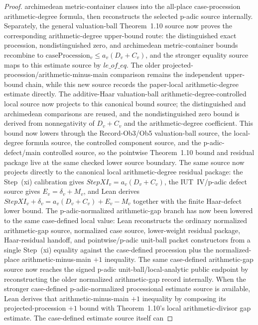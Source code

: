 \begin{proof}
  archimedean metric-container clauses into the all-place case-procession
  arithmetic-degree formula, then reconstructs the selected p-adic source
  internally.  Separately, the general
  valuation-ball Theorem~1.10 source now proves the
  corresponding arithmetic-degree upper-bound route: the distinguished exact
  procession, nondistinguished zero, and archimedean metric-container bounds
  recombine to \(\mathrm{caseProcession}_v\leq a_v(D_v+C_v)\), and the stronger
  equality source maps to this estimate source by \(le\_of\_eq\).  The older
  projected-procession/arithmetic-minus-main comparison remains the independent
  upper-bound chain, while this new source records the paper-local
  arithmetic-degree estimate directly.  The additive-Haar valuation-ball
  arithmetic-degree-controlled local source now projects to this canonical
  bound source; the distinguished and archimedean comparisons are reused, and
  the nondistinguished zero bound is derived from nonnegativity of
  \(D_v+C_v\) and the arithmetic-degree coefficient.  This bound now lowers
  through the Record-Ob3/Ob5 valuation-ball source, the local-degree formula
  source, the controlled component source, and the p-adic-defect/main
  controlled source, so the pointwise Theorem~1.10 bound and residual package
  live at the same checked lower source boundary.  The same source now projects
  directly to the canonical local arithmetic-degree residual package:
  the Step~(xi) calibration gives \(StepXI_v=a_v(D_v+C_v)\), the IUT~IV/p-adic
  defect source gives \(E_v=\delta_v+M_v\), and Lean derives
  \(StepXI_v+\delta_v=a_v(D_v+C_v)+E_v-M_v\) together with the finite
  Haar-defect lower bound.  The
  p-adic-normalized arithmetic-gap branch has now been lowered to the same
  case-defined local value: Lean reconstructs the ordinary normalized
  arithmetic-gap source, normalized case source, lower-weight residual package,
  Haar-residual handoff, and pointwise/p-adic unit-ball packet constructors
  from a single Step~(xi) equality against the case-defined procession plus the
  normalized-place arithmetic-minus-main \(+1\) inequality.  The same
  case-defined arithmetic-gap source now reaches the signed p-adic
  unit-ball/local-analytic public endpoint by reconstructing the older
  normalized arithmetic-gap record internally.  When the stronger
  case-defined p-adic-normalized processional estimate source is available,
  Lean derives that arithmetic-minus-main \(+1\) inequality by composing its
  projected-procession \(+1\) bound with Theorem~1.10's local
  arithmetic-divisor gap estimate.  The case-defined estimate source itself can

\end{proof}
